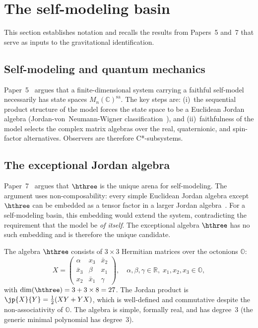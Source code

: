 
\section{The self-modeling basin}
\label{sec:basin}

This section establishes notation and recalls the results from
Papers~5 and~7 that serve as inputs to the gravitational identification.

\subsection{Self-modeling and quantum mechanics}

Paper~5~\cite{Paper5} argues that a finite-dimensional system carrying a
faithful self-model necessarily has state spaces $M_n(\mathbb{C})^{\mathrm{sa}}$.
The key steps are: (i)~the sequential product structure of the model
forces the state space to be a Euclidean Jordan algebra
(Jordan-von~Neumann-Wigner classification~\cite{JordanVonNeumannWigner1934}),
and (ii)~faithfulness of the model selects the complex matrix algebras
over the real, quaternionic, and spin-factor alternatives. Observers are
therefore C*-subsystems.

\subsection{The exceptional Jordan algebra}

Paper~7~\cite{Paper7} argues that $\hthree$ is the unique arena for
self-modeling. The argument uses non-composability: every simple
Euclidean Jordan algebra except $\hthree$ can be embedded as a tensor
factor in a larger Jordan algebra~\cite{BarnumGraydonWilce2020}. For a
self-modeling basin, this embedding would extend the system, contradicting
the requirement that the model be \emph{of itself}. The exceptional
algebra $\hthree$ has no such embedding and is therefore the unique
candidate.

The algebra $\hthree$ consists of $3 \times 3$ Hermitian matrices over
the octonions $\mathbb{O}$:
\begin{equation}
\label{eq:h3o-element}
X = \begin{pmatrix}
\alpha & x_3 & \bar{x}_2 \\
\bar{x}_3 & \beta & x_1 \\
x_2 & \bar{x}_1 & \gamma
\end{pmatrix}, \quad
\alpha, \beta, \gamma \in \mathbb{R},\;
x_1, x_2, x_3 \in \mathbb{O},
\end{equation}
with $\dim(\hthree) = 3 + 3 \times 8 = 27$. The Jordan product is
$\jp{X}{Y} = \tfrac{1}{2}(XY + YX)$, which is well-defined and
commutative despite the non-associativity of $\mathbb{O}$. The algebra is
simple, formally real, and has degree~3 (the generic minimal polynomial
has degree~3).

